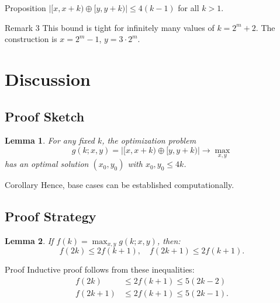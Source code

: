 \documentclass[handout,notheorems]{beamer}
\newtheorem*{lemma}{Lemma}
\theoremstyle{definition}
\begin{document}
\begin{frame}
    \begin{block}{Proposition}
        $|[x, x+k) \oplus [y, y+k)| \le 4(k-1)$ for all $k > 1$.
    \end{block}
    \pause
    \begin{block}{Remark 3}
        This bound is tight for infinitely many values of $k = 2^m + 2$. The construction is $x = 2^m - 1$, $y = 3 \cdot 2^m$.
    \end{block}
\end{frame}

\section{Discussion}

\subsection{Proof Sketch}

\begin{frame}
    \begin{lemma}
        For any fixed $k$, the optimization problem 
        \begin{equation}
            g(k; x, y) = |[x, x+k) \oplus [y, y+k)| \to \max_{x, y}
        \end{equation}
        has an optimal solution $(x_0, y_0)$ with $x_0, y_0 \le 4k$.
    \end{lemma}
    \pause
    \begin{block}{Corollary}
        Hence, base cases can be established computationally.
    \end{block}
\end{frame}

\subsection{Proof Strategy}

\begin{frame}
    \begin{lemma}
        If $f(k) = \max_{x, y} g(k; x, y)$, then:
        \begin{equation}
            f(2k) \le 2f(k+1), \quad f(2k+1) \le 2f(k+1).
        \end{equation}
    \end{lemma}
    \pause
    \begin{block}{Proof}
        Inductive proof follows from these inequalities:
        \begin{equation}
            \begin{aligned}
                f(2k) &\le 2f(k+1) \le 5 (2k - 2) \\
                f(2k+1) &\le 2f(k+1) \le 5 (2k - 1).
            \end{aligned}
        \end{equation}
    \end{block}
\end{frame}
\end{document}

